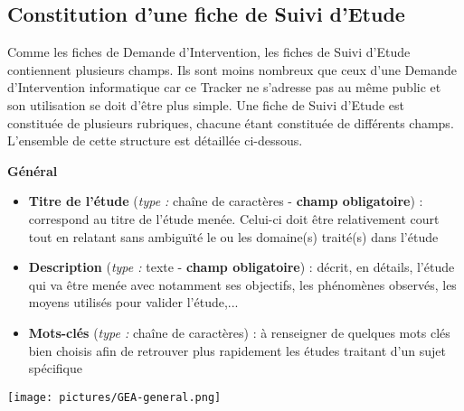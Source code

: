 \subsection{Constitution d'une fiche de Suivi d'Etude}
Comme les fiches de Demande d'Intervention, les fiches de Suivi d'Etude contiennent plusieurs champs. Ils sont moins nombreux que ceux d'une Demande d'Intervention informatique car ce Tracker ne s'adresse pas au même public et son utilisation se doit d'être plus simple.  Une fiche de Suivi d'Etude est constituée de plusieurs rubriques, chacune étant constituée de différents champs. L'ensemble de cette structure est détaillée ci-dessous.\\
\begin{minipage}[c]{0.45\linewidth}
\textbf{Général}

\begin{itemize}[label=$\Rightarrow$, font=\LARGE]
   \item \textbf{Titre de l'étude} (\textit{type :} chaîne de caractères - \textbf{champ obligatoire}) : correspond au titre de l'étude menée. Celui-ci doit être relativement court tout en relatant sans ambiguïté le ou les domaine(s) traité(s) dans l'étude
   \item \textbf{Description} (\textit{type :} texte - \textbf{champ obligatoire}) : décrit, en détails, l'étude qui va être menée avec notamment ses objectifs, les phénomènes observés, les moyens utilisés pour valider l'étude,...
   \item \textbf{Mots-clés} (\textit{type :} chaîne de caractères) : à renseigner de quelques mots clés bien choisis afin de retrouver plus rapidement les études traitant d'un sujet spécifique
\end{itemize}

\end{minipage} \hfill
\begin{minipage}[c]{0.5\linewidth}
   \texttt{[image: pictures/GEA-general.png]}\vspace*{0.2cm}

\end{minipage}

\vspace{0.5cm}

